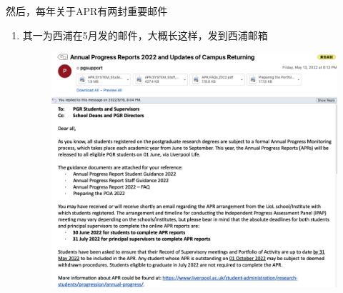 然后，每年关于APR有两封重要邮件
\begin{enumerate}
    \item 
        \begin{minipage}{0.3\textwidth}
            其一为西浦在5月发的邮件，大概长这样，发到西浦邮箱
        \end{minipage}
        \begin{minipage}{0.63\textwidth}
            \begin{figure}[H]
                \includegraphics[width=0.95\columnwidth, right]{author-folder/Kai.Wu/APR_email.jpg}
            \end{figure}
        \end{minipage}


\end{enumerate}
